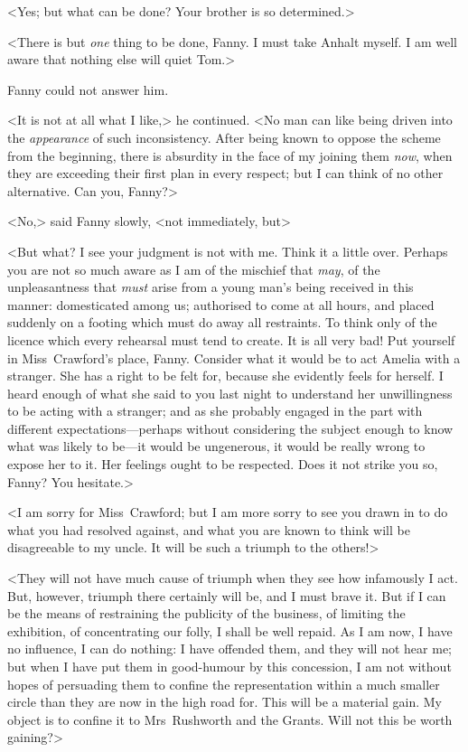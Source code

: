 <Yes; but what can be done? Your brother is so determined.>

<There is but \textit{one}  thing to be done, Fanny. I must take Anhalt myself. I am well aware that nothing else will quiet Tom.>

Fanny could not answer him.

<It is not at all what I like,> he continued. <No man can like being driven into the \textit{appearance}  of such inconsistency. After being known to oppose the scheme from the beginning, there is absurdity in the face of my joining them \textit{now}, when they are exceeding their first plan in every respect; but I can think of no other alternative. Can you, Fanny?>

<No,> said Fanny slowly, <not immediately, but\longdash>

<But what? I see your judgment is not with me. Think it a little over. Perhaps you are not so much aware as I am of the mischief that \textit{may}, of the unpleasantness that \textit{must}  arise from a young man's being received in this manner: domesticated among us; authorised to come at all hours, and placed suddenly on a footing which must do away all restraints. To think only of the licence which every rehearsal must tend to create. It is all very bad! Put yourself in Miss~Crawford's place, Fanny. Consider what it would be to act Amelia with a stranger. She has a right to be felt for, because she evidently feels for herself. I heard enough of what she said to you last night to understand her unwillingness to be acting with a stranger; and as she probably engaged in the part with different expectations—perhaps without considering the subject enough to know what was likely to be—it would be ungenerous, it would be really wrong to expose her to it. Her feelings ought to be respected. Does it not strike you so, Fanny? You hesitate.>

<I am sorry for Miss~Crawford; but I am more sorry to see you drawn in to do what you had resolved against, and what you are known to think will be disagreeable to my uncle. It will be such a triumph to the others!>

<They will not have much cause of triumph when they see how infamously I act. But, however, triumph there certainly will be, and I must brave it. But if I can be the means of restraining the publicity of the business, of limiting the exhibition, of concentrating our folly, I shall be well repaid. As I am now, I have no influence, I can do nothing: I have offended them, and they will not hear me; but when I have put them in good-humour by this concession, I am not without hopes of persuading them to confine the representation within a much smaller circle than they are now in the high road for. This will be a material gain. My object is to confine it to Mrs~Rushworth and the Grants. Will not this be worth gaining?>

